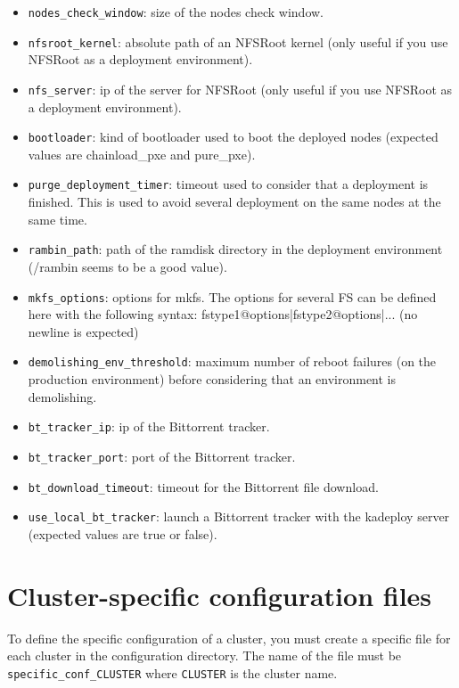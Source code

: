 \documentclass[a4wide,10pt,oneside]{book}
\begin{document}
\begin{itemize}
\item \texttt{nodes\_check\_window}: size of the nodes check window.
\item \texttt{nfsroot\_kernel}: absolute path of an NFSRoot kernel (only useful if you use NFSRoot as a deployment environment).
\item \texttt{nfs\_server}: ip of the server for NFSRoot (only useful if you use NFSRoot as a deployment environment).
\item \texttt{bootloader}: kind of bootloader used to boot the deployed nodes (expected values are chainload\_pxe and pure\_pxe).
\item \texttt{purge\_deployment\_timer}: timeout used to consider that a deployment is finished. This is used to avoid several deployment on the same nodes at the same time.
\item \texttt{rambin\_path}: path of the ramdisk directory in the deployment environment (/rambin seems to be a good value).
\item \texttt{mkfs\_options}: options for mkfs. The options for several FS can be defined here with the following syntax: fstype1@options|fstype2@options|... (no newline is expected)
\item \texttt{demolishing\_env\_threshold}: maximum number of reboot failures (on the production environment) before considering that an environment is demolishing.
\item \texttt{bt\_tracker\_ip}: ip of the Bittorrent tracker.
\item \texttt{bt\_tracker\_port}: port of the Bittorrent tracker.
\item \texttt{bt\_download\_timeout}: timeout for the Bittorrent file download.
\item \texttt{use\_local\_bt\_tracker}: launch a Bittorrent tracker with the kadeploy server (expected values are true or false).
\end{itemize}

\section{Cluster-specific configuration files}\label{sec:specific_config}
To define the specific configuration of a cluster, you must create a specific file for each cluster in the configuration directory. The name of the file must be \texttt{specific\_conf\_CLUSTER} where \texttt{CLUSTER} is the cluster name.
\end{document}
